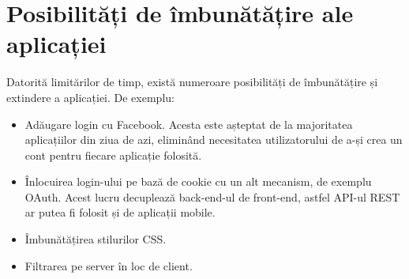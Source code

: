 \section{Posibilități de îmbunătățire ale aplicației}

Datorită limitărilor de timp, există numeroare posibilități de 
îmbunătățire și extindere a aplicației. De exemplu:
\begin{itemize}
\item Adăugare login cu Facebook. Acesta este așteptat de la
majoritatea aplicațiilor din ziua de azi, eliminând necesitatea
utilizatorului de a-și crea un cont pentru fiecare aplicație folosită.
\item Înlocuirea login-ului pe bază de cookie cu un alt mecanism,
de exemplu OAuth. Acest lucru decuplează back-end-ul de front-end, 
astfel API-ul REST ar putea fi folosit
și de aplicații mobile.
\item Îmbunătățirea stilurilor CSS.
\item Filtrarea pe server în loc de client.
\end{itemize}
